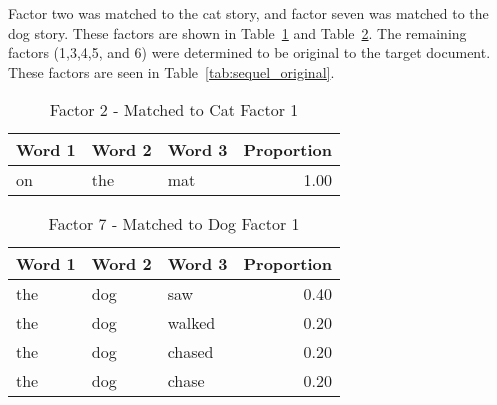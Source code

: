 \documentclass[../ut-dissertation.tex]{subfiles}
\begin{document}
Factor two was matched to the cat story, and factor seven was matched
to the dog story.  These factors are shown in
Table~\ref{tab:catfactor} and Table~\ref{tab:dogfactor}.  The
remaining factors (1,3,4,5, and 6) were determined to be original to
the target document.  These factors are seen in
Table~\ref{tab:sequel_original}.

\begin{table}[p]
  \centering
  \caption{Factor 2 - Matched to Cat Factor 1}\label{tab:catfactor}
  \begin{tabular}{lll|r}
    \hline
    Word 1 & Word 2 & Word 3 & Proportion\\
    \hline
    on & the & mat & 1.00\\
    \hline
  \end{tabular}
\end{table}

\begin{table}[p]
  \centering
  \caption{Factor 7 - Matched to Dog Factor 1}\label{tab:dogfactor}
  \begin{tabular}{lll|r}
    \hline
    Word 1 & Word 2 & Word 3 & Proportion\\
    \hline
    the & dog & saw & 0.40\\
    the & dog & walked & 0.20\\
    the & dog & chased & 0.20\\
    the & dog & chase & 0.20\\
    \hline
  \end{tabular}
\end{table}
\end{document}
